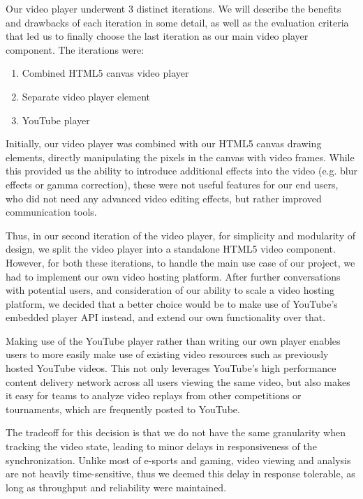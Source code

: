 \documentclass[conference]{IEEEtran}
\begin{document}
  Our video player underwent 3 distinct iterations. We will describe the benefits and drawbacks of each iteration in some detail, as well as the evaluation criteria that led us to finally choose the last iteration as our main video player component. The iterations were:

  \begin{enumerate}
      \item Combined HTML5 canvas video player
      \item Separate video player element
      \item YouTube player
  \end{enumerate}

  Initially, our video player was combined with our HTML5 canvas drawing elements, directly manipulating the pixels in the canvas with video frames. While this provided us the ability to introduce additional effects into the video (e.g. blur effects or gamma correction), these were not useful features for our end users, who did not need any advanced video editing effects, but rather improved communication tools.

  Thus, in our second iteration of the video player, for simplicity and modularity of design, we split the video player into a standalone HTML5 video component. However, for both these iterations, to handle the main use case of our project, we had to implement our own video hosting platform. After further conversations with potential users, and consideration of our ability to scale a video hosting platform, we decided that a better choice would be to make use of YouTube's embedded player API instead, and extend our own functionality over that.

  Making use of the YouTube player rather than writing our own player enables users to more easily make use of existing video resources such as previously hosted YouTube videos. This not only leverages YouTube's high performance content delivery network across all users viewing the same video, but also makes it easy for teams to analyze video replays from other competitions or tournaments, which are frequently posted to YouTube.

  The tradeoff for this decision is that we do not have the same granularity when tracking the video state, leading to minor delays in responsiveness of the synchronization. Unlike most of e-sports and gaming, video viewing and analysis are not heavily time-sensitive, thus we deemed this delay in response tolerable, as long as throughput and reliability were maintained.
\end{document}
